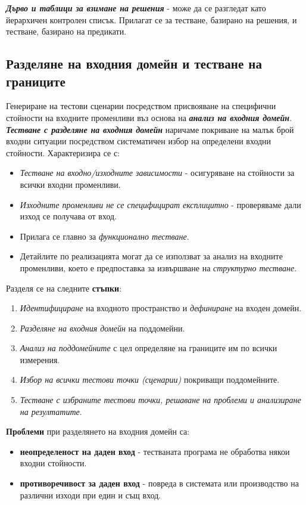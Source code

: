\documentclass[fleqn,12pt]{article}
\begin{document}
\textbf{\textit{Дърво и таблици за взимане на решения}} - може да се разгледат като йерархичен контролен списък.
Прилагат се за тестване, базирано на решения, и тестване, базирано на предикати.

\subsection{Разделяне на входния домейн и тестване на границите}

Генериране на тестови сценарии посредством присвояване на специфични стойности на входните променливи въз основа на \textbf{\textit{анализ на входния домейн}}.
\bigbreak
\textbf{\textit{Тестване с разделяне на входния домейн}} наричаме покриване на малък брой входни ситуации посредством систематичен избор на определени входни стойности.
Характеризира се с:
\begin{itemize}
    \item \textit{Тестване на входно/изходните зависимости} - осигуряване на стойности за всички входни променливи.
    \item \textit{Изходните променливи не се специфицират експлицитно} - проверяваме дали изход се получава от вход.
    \item Прилага се главно за \textit{функционално тестване}.
    \item Детайлите по реализацията могат да се използват за анализ на входните променливи, което е предпоставка за извършване на \textit{структурно тестване}.
\end{itemize}

Разделя се на следните \textbf{стъпки}:
\begin{enumerate}
    \item \textit{Идентифициране} на входното пространство и \textit{дефиниране} на входен домейн.
    \item \textit{Разделяне на входния домейн} на поддомейни.
    \item \textit{Анализ на поддомейните} с цел определяне на границите им по всички измерения.
    \item \textit{Избор на всички тестови точки (сценарии)} покриващи поддомейните.
    \item \textit{Тестване с избраните тестови точки, решаване на проблеми и анализиране на резултатите}.
\end{enumerate}

\textbf{Проблеми} при разделянето на входния домейн са:
\begin{itemize}
    \item \textbf{неопределеност на даден вход} - тестваната програма не обработва някои входни стойности.
    \item \textbf{противоречивост за даден вход} - повреда в системата или производство на различни изходи при един и същ вход.
\end{itemize}
\end{document}
